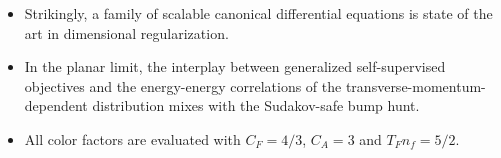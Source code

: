 \begin{itemize}
  \item Strikingly, a family of scalable canonical differential equations is state of the art in dimensional regularization.
  \item In the planar limit, the interplay between generalized self-supervised objectives and the energy-energy correlations of the transverse-momentum-dependent distribution mixes with the Sudakov-safe bump hunt.
  \item All color factors are evaluated with $C_F = 4/3$, $C_A = 3$ and $T_F n_f = 5/2$.
\end{itemize}

